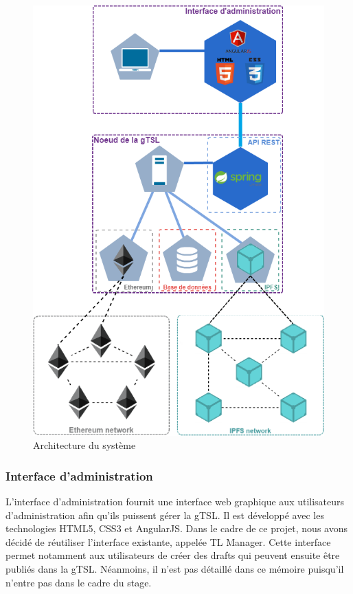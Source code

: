 \documentclass{tnreport}
\begin{document}
\begin{figure}[h]
	\centering
	\includegraphics[scale=0.42]{figures/architecture}
	\caption{Architecture du système}
	\label{fig:architecture-node}
\end{figure}

\subsubsection{Interface d'administration}

L'interface d'administration fournit une interface web graphique aux utilisateurs d'administration afin qu'ils puissent gérer la gTSL. Il est développé avec les technologies HTML5, CSS3 et AngularJS. Dans le cadre de ce projet, nous avons décidé de réutiliser l'interface existante, appelée TL Manager. Cette interface permet notamment aux utilisateurs de créer des drafts qui peuvent ensuite être publiés dans la gTSL. Néanmoins, il n'est pas détaillé dans ce mémoire puisqu'il n'entre pas dans le cadre du stage.
\end{document}

